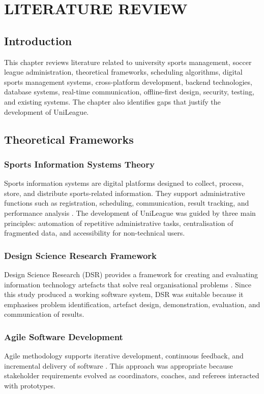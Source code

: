 \documentclass[12pt,a4paper]{report}
\begin{document}
\chapter{LITERATURE REVIEW}
\section{Introduction}
This chapter reviews literature related to university sports management, soccer league
administration, theoretical frameworks, scheduling algorithms, digital sports management
systems, cross-platform development, backend technologies, database systems, real-time
communication, offline-first design, security, testing, and existing systems. The chapter
also identifies gaps that justify the development of UniLeague.

\section{Theoretical Frameworks}
\subsection{Sports Information Systems Theory}
Sports information systems are digital platforms designed to collect, process, store, and
distribute sports-related information. They support administrative functions such as
registration, scheduling, communication, result tracking, and performance analysis \cite{sarlak2024}.
The development of UniLeague was guided by three main principles: automation of repetitive
administrative tasks, centralisation of fragmented data, and accessibility for non-technical users.

\subsection{Design Science Research Framework}
Design Science Research (DSR) provides a framework for creating and evaluating information
technology artefacts that solve real organisational problems \cite{hevner2004}. Since this
study produced a working software system, DSR was suitable because it emphasises problem
identification, artefact design, demonstration, evaluation, and communication of results.

\subsection{Agile Software Development}
Agile methodology supports iterative development, continuous feedback, and incremental delivery
of software \cite{pressman2019}. This approach was appropriate because stakeholder requirements
evolved as coordinators, coaches, and referees interacted with prototypes.
\end{document}
